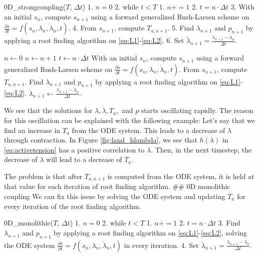 0D\_strongcoupling(\(T\), \(\Delta t\)) 1. \(n=0\) 2. while \(t<T\) 1.
\(n+=1\) 2. \(t=n\cdot \Delta t\) 3. With an initial \(s_{n}\), compute
\(s_{n+1}\) using a forward generalized Rush-Larsen scheme on
\(\frac{ \partial s }{ \partial t }=f(s_{n},\lambda_{n},\dot{\lambda}_{n},t)\).
4. From \(s_{n+1}\), compute \(T_{a,n+1}\). 5. Find \(\lambda_{n+1}\)
and \(p_{n+1}\) by applying a root finding algorithm on
\eqref{eq:L1}-\eqref{eq:L2}. 6. Set
\(\dot{\lambda}_{n+1}=\frac{\lambda_{n+1}-\lambda_{n}}{\Delta t}\).

\begin{algorithm}
\caption{$0D\_strongcoupling(T, \Delta t)$}
\begin{algorithmic}[1]
    \State $n \gets 0$
        \State $n \gets n + 1$
        \State $t \gets n \cdot \Delta t$
        \State With an initial $s_{n}$, compute $s_{n+1}$ using a forward generalized Rush-Larsen scheme on $\frac{ \partial s }{ \partial t }=f(s_{n},\lambda_{n},\dot{\lambda}_{n},t)$.
        \State From $s_{n+1}$, compute $T_{a,n+1}$.
        \State Find $\lambda_{n+1}$ and $p_{n+1}$ by applying a root finding algorithm on \eqref{eq:L1}-\eqref{eq:L2}.
        \State $\dot{\lambda}_{n+1} \gets \frac{\lambda_{n+1}-\lambda_{n}}{\Delta t}$.
    \EndWhile
\end{algorithmic}
\end{algorithm}

We see that the solutions for \(\lambda,\dot{\lambda},T_{a},\) and \(p\)
starts oscillating rapidly. The reason for this oscillation can be
explained with the following example: Let's say that we find an increase
in \(T_{a}\) from the ODE system. This leads to a decrease of
\(\lambda\) through contraction. In Figure \ref{fig:land_hlambda}, we
see that \(h(\lambda)\) in \eqref{eq:activetension} has a positive
correlation to \(\lambda\). Then, in the next timestep, the decrease of
\(\lambda\) will lead to a decrease of \(T_{a}\).

The problem is that after \(T_{a,n+1}\) is computed from the ODE system,
it is held at that value for each iteration of root finding algorithm.
\#\# 0D monolithic coupling We can fix this issue by solving the ODE
system and updating \(T_{a}\) for every iteration of the root finding
algorithm.

0D\_monolithic(\(T\), \(\Delta t\)) 1. \(n=0\) 2. while \(t<T\) 1.
\(n+=1\) 2. \(t=n\cdot \Delta t\) 3. Find \(\lambda_{n+1}\) and
\(p_{n+1}\) by applying a root finding algorithm on
\eqref{eq:L1}-\eqref{eq:L2}, solving the ODE system
\(\frac{ \partial s }{ \partial t }=f(s_{n},\lambda_{n},\dot{\lambda}_{n},t)\)
in every iteration. 4. Set
\(\dot{\lambda}_{n+1}=\frac{\lambda_{n+1}-\lambda_{n}}{\Delta t}\).

